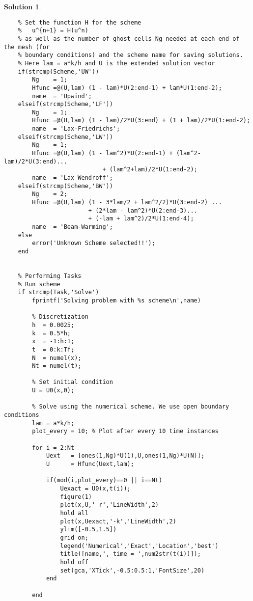 \documentclass[10pt,letterpaper]{article}
\theoremstyle{break}
\newtheorem{mysolution}{Solution}
\newenvironment{solution}{\begin{mysolution}}{\end{mysolution}}
\begin{document}
\begin{solution}
\begin{lstlisting}
    % Set the function H for the scheme
    %   u^{n+1} = H(u^n)
    % as well as the number of ghost cells Ng needed at each end of the mesh (for
    % boundary conditions) and the scheme name for saving solutions.
    % Here lam = a*k/h and U is the extended solution vector
    if(strcmp(Scheme,'UW'))
        Ng    = 1;
        Hfunc =@(U,lam) (1 - lam)*U(2:end-1) + lam*U(1:end-2);
        name  = 'Upwind';
    elseif(strcmp(Scheme,'LF'))
        Ng    = 1;
        Hfunc =@(U,lam) (1 - lam)/2*U(3:end) + (1 + lam)/2*U(1:end-2);
        name  = 'Lax-Friedrichs';
    elseif(strcmp(Scheme,'LW'))
        Ng    = 1;
        Hfunc =@(U,lam) (1 - lam^2)*U(2:end-1) + (lam^2-lam)/2*U(3:end)...
                            + (lam^2+lam)/2*U(1:end-2);
        name  = 'Lax-Wendroff';
    elseif(strcmp(Scheme,'BW'))
        Ng    = 2;
        Hfunc =@(U,lam) (1 - 3*lam/2 + lam^2/2)*U(3:end-2) ...
                        + (2*lam - lam^2)*U(2:end-3)...
                        + (-lam + lam^2)/2*U(1:end-4);
        name  = 'Beam-Warming';
    else
        error('Unknown Scheme selected!!');
    end
    
    
    % Performing Tasks
    % Run scheme
    if strcmp(Task,'Solve')
        fprintf('Solving problem with %s scheme\n',name)
        
        % Discretization
        h  = 0.0025;
        k  = 0.5*h;
        x  = -1:h:1;
        t  = 0:k:Tf;
        N  = numel(x);
        Nt = numel(t);
        
        % Set initial condition
        U = U0(x,0);
        
        % Solve using the numerical scheme. We use open boundary conditions
        lam = a*k/h;
        plot_every = 10; % Plot after every 10 time instances
        
        for i = 2:Nt
            Uext   = [ones(1,Ng)*U(1),U,ones(1,Ng)*U(N)];
            U      = Hfunc(Uext,lam);
            
            if(mod(i,plot_every)==0 || i==Nt)
                Uexact = U0(x,t(i));
                figure(1)
                plot(x,U,'-r','LineWidth',2)
                hold all
                plot(x,Uexact,'-k','LineWidth',2)
                ylim([-0.5,1.5])
                grid on;
                legend('Numerical','Exact','Location','best')
                title([name,', time = ',num2str(t(i))]);
                hold off
                set(gca,'XTick',-0.5:0.5:1,'FontSize',20)
            end
            
        end
        

\end{lstlisting}
\end{solution}
\end{document}
